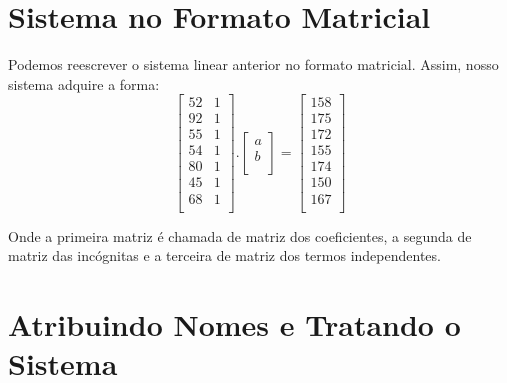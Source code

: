 \documentclass{article}
\begin{document}
\section{Sistema no Formato Matricial}
    Podemos reescrever o sistema linear anterior no formato matricial. Assim, nosso sistema adquire a forma:
    \[
    \begin{bmatrix}
        52 & 1 \\
        92 & 1 \\
        55 & 1 \\
        54 & 1 \\
        80 & 1 \\
        45 & 1 \\
        68 & 1 \\
    \end{bmatrix}
    .
    \begin{bmatrix}
        a \\
        b \\
    \end{bmatrix}
    =
    \begin{bmatrix}
        158 \\
        175 \\
        172 \\
        155 \\
        174 \\
        150 \\
        167 \\
    \end{bmatrix}
    \]
    
    Onde a primeira matriz é chamada de matriz dos coeficientes, a segunda de matriz das incógnitas e a terceira de matriz dos termos independentes.


\section{Atribuindo Nomes e Tratando o Sistema}
\end{document}

